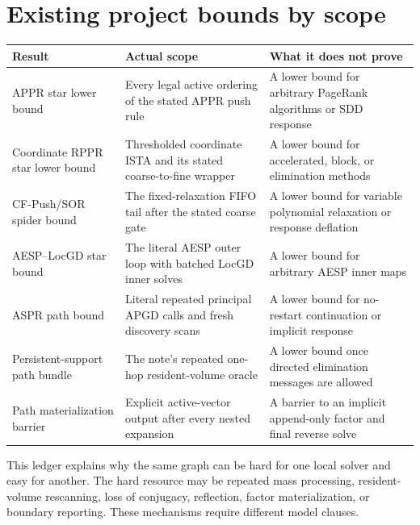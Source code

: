 \section{Existing project bounds by scope}
\label{sec:ledger}

\begin{center}
\small
\begin{tabularx}{\textwidth}{@{}p{}p{}X@{}}
\toprule
Result & Actual scope & What it does not prove \\
\midrule
APPR star lower bound
& Every legal active ordering of the stated APPR push rule
& A lower bound for arbitrary PageRank algorithms or SDD response \\
Coordinate RPPR star lower bound
& Thresholded coordinate ISTA and its stated coarse-to-fine wrapper
& A lower bound for accelerated, block, or elimination methods \\
CF-Push/SOR spider bound
& The fixed-relaxation FIFO tail after the stated coarse gate
& A lower bound for variable polynomial relaxation or response deflation \\
AESP--LocGD star bound
& The literal AESP outer loop with batched LocGD inner solves
& A lower bound for arbitrary AESP inner maps \\
ASPR path bound
& Literal repeated principal APGD calls and fresh discovery scans
& A lower bound for no-restart continuation or implicit response \\
Persistent-support path bundle
& The note's repeated one-hop resident-volume oracle
& A lower bound once directed elimination messages are allowed \\
Path materialization barrier
& Explicit active-vector output after every nested expansion
& A barrier to an implicit append-only factor and final reverse solve \\
\bottomrule
\end{tabularx}
\end{center}

This ledger explains why the same graph can be hard for one local solver and
easy for another.  The hard resource may be repeated mass processing,
resident-volume rescanning, loss of conjugacy, reflection, factor
materialization, or boundary reporting.  These mechanisms require different
model clauses.
